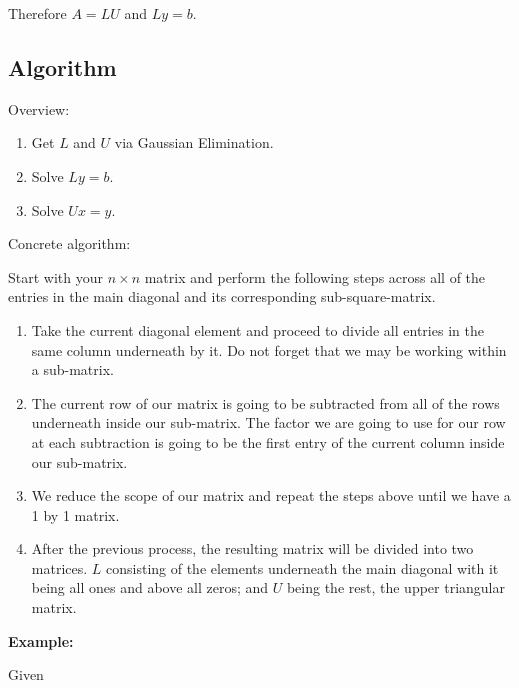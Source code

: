 Therefore \(A = LU\) and \(Ly = b\).

\subsection{Algorithm}

Overview: 

\begin{enumerate}
    
    \item Get \(L\) and \(U\) via Gaussian Elimination. 

    \item Solve \(Ly = b\). 

    \item Solve \(Ux = y\). 

\end{enumerate}

Concrete algorithm: 

Start with your \(n \times n\) matrix and perform the following steps across all of the 
entries in the main diagonal and its corresponding sub-square-matrix.

\begin{enumerate}

    \item Take the current diagonal element and proceed to divide all entries in the same column underneath by it. Do not forget that we may be working 
    within a sub-matrix.

    \item The current row of our matrix is going to be subtracted from all of the rows underneath inside our sub-matrix. The factor we 
    are going to use for our row at each subtraction is going to be the first entry of the current column inside our sub-matrix.
    
    \item We reduce the scope of our matrix and repeat the steps above until we have a 1 by 1 matrix.
    
    \item After the previous process, the resulting matrix will be divided into two matrices. \(L\) consisting of 
    the elements underneath the main diagonal with it being all ones and above all zeros; and \(U\) being the rest, the upper triangular matrix.

\end{enumerate}

\textbf{Example:}

Given


